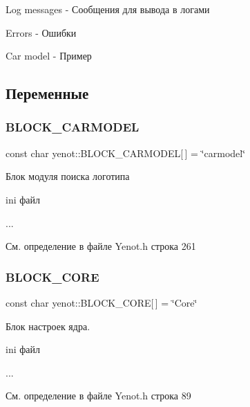 Log messages -\/ Сообщения для вывода в логами

Errors -\/ Ошибки

Car model -\/ Пример 

\subsection{Переменные}
\mbox{\label{namespaceyenot_a3c950090a29f01a39ec562e1e30452b9}} 
\subsubsection{\texorpdfstring{B\+L\+O\+C\+K\+\_\+\+C\+A\+R\+M\+O\+D\+EL}{BLOCK\_CARMODEL}}
{\footnotesize\ttfamily const char yenot\+::\+B\+L\+O\+C\+K\+\_\+\+C\+A\+R\+M\+O\+D\+EL\mbox{[}$\,$\mbox{]} = \char`\"{}carmodel\char`\"{}}

Блок модуля поиска логотипа

ini файл 
\begin{DoxyCode}
[carmodel]
...
\end{DoxyCode}
 

См. определение в файле Yenot.\+h строка 261

\mbox{\label{namespaceyenot_a2172a9f506029215b790a51a4023e1ac}} 
\subsubsection{\texorpdfstring{B\+L\+O\+C\+K\+\_\+\+C\+O\+RE}{BLOCK\_CORE}}
{\footnotesize\ttfamily const char yenot\+::\+B\+L\+O\+C\+K\+\_\+\+C\+O\+RE\mbox{[}$\,$\mbox{]} = \char`\"{}Core\char`\"{}}

Блок настроек ядра.

ini файл 
\begin{DoxyCode}
[Core]
...
\end{DoxyCode}
 

См. определение в файле Yenot.\+h строка 89

\mbox{\label{namespaceyenot_a73be0cdcde2af378cd4043f56d4776e2}} 
